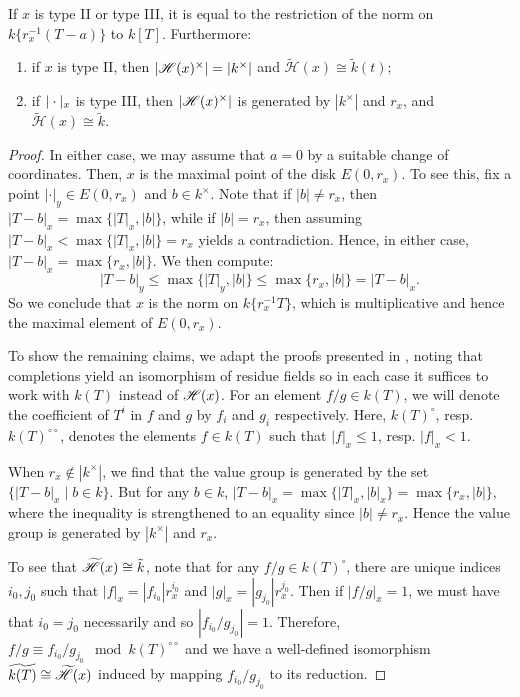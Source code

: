 \begin{prop}
    If $x$ is type II or type III, it is equal to the restriction of the norm on $k\{r_{x}^{-1}(T - a)\}$ to $k[T]$. Furthermore:
    \begin{enumerate}
        \item if $x$ is type II, then $|\mathscr{H}(x)^{\times}| = |k^\times|$ and $\tilde{\mathscr{H}}(x) \cong \tilde{k}(t)$;
        \item if $|\cdot|_x$ is type III, then $|\mathscr{H}(x)^\times|$ is generated by $|k^\times|$ and $r_x$, and $\tilde{\mathscr{H}}(x) \cong \tilde{k}$.
    \end{enumerate}
\end{prop}
\begin{proof}
    In either case, we may assume that $a = 0$ by a suitable change of coordinates. 
    Then, $x$ is the maximal point of the disk $E(0, r_x)$. 
    To see this, fix a point $|\cdot|_y \in E(0, r_x)$ and $b \in k^{\times}$. 
    Note that if $|b| \neq r_x$, then $|T - b|_x = \max \{|T|_x, |b|\}$, while if $|b| = r_x$, then assuming $|T - b|_x < \max \{ |T|_x, |b| \} = r_x$ yields a contradiction. Hence, in either case, $|T - b|_x = \max \{r_x, |b|\}$. We then compute: \[|T - b|_y \leq \max \{|T|_y, |b|\} \leq \max \{r_x, |b|\} = |T - b|_x.\] So we conclude that $x$ is the norm on $k\{r_x^{-1}T\}$, which is multiplicative and hence the maximal element of $E(0, r_x)$.
    
    To show the remaining claims, we adapt the proofs presented in \parencite[Prop. 2.3]{potdynams}, noting that completions yield an isomorphism of residue fields so in each case it suffices to work with $k(T)$ instead of $\mathscr{H}(x)$. For an element $f/g \in k(T)$, we will denote the coefficient of $T^i$ in $f$ and $g$ by $f_i$ and $g_i$ respectively. 
    Here, $k(T)^{\circ}$, resp. $k(T)^{\circ \circ}$, denotes the elements $f \in k(T)$ such that $|f|_x \leq 1$, resp. $|f|_x < 1$.
    
    When $r_x \not\in |k^\times|$, we find that the value group is generated by the set $\{ |T - b|_x \; \vert \; b \in k\}$. But for any $b \in k$, $|T - b|_x = \max \{ |T|_x, |b|_x\} = \max \{ r_x, |b|\}$, where the
    inequality is strengthened to an equality since $|b| \neq r_x$. Hence the value group is 
    generated by $|k^\times|$ and $r_x$. 
    
    To see that $\widetilde{\mathscr{H}}(x) \cong \tilde{k}$, note that for any $f/g \in k(T)^{\circ}$, there are unique indices $i_0, j_0$ such that $|f|_x = |f_{i_0}| r_x^{i_0}$ and $|g|_x = |g_{j_0}| r_x^{j_0}$. Then if $|f/g|_x = 1$, we must have that $i_0 = j_0$ necessarily and so $|f_{i_0}/g_{j_0}| = 1$. Therefore, $f/g \equiv f_{i_0}/g_{j_0} \mod k(T)^{\circ\circ}$ and we have a well-defined isomorphism $\widetilde{k(T)} \cong \widetilde{\mathscr{H}}(x)$ induced by mapping $f_{i_0}/g_{j_0}$ to its reduction.
    

\end{proof}
